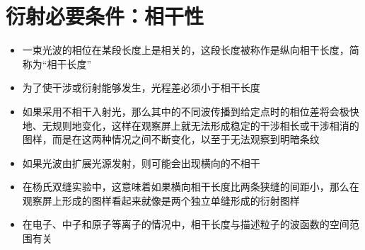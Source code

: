 \section{衍射必要条件：相干性}

\begin{slide}
    \begin{itemize}
        \item 一束光波的相位在某段长度上是相关的，这段长度被称作是纵向相干长度，简称为“相干长度”
        \item 为了使干涉或衍射能够发生，光程差必须小于相干长度
        \item 如果采用不相干入射光，那么其中的不同波传播到给定点时的相位差将会极快地、无规则地变化，这样在观察屏上就无法形成稳定的干涉相长或干涉相消的图样，而是在这两种情况之间不断变化，以至于无法观察到明暗条纹
        \item 如果光波由扩展光源发射，则可能会出现横向的不相干
        \item 在杨氏双缝实验中，这意味着如果横向相干长度比两条狭缝的间距小，那么在观察屏上形成的图样看起来就像是两个独立单缝形成的衍射图样
        \item 在电子、中子和原子等离子的情况中，相干长度与描述粒子的波函数的空间范围有关
    \end{itemize}
\end{slide}

